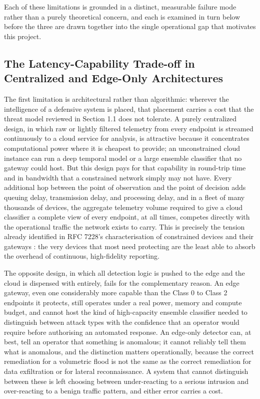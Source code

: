 Each of these limitations is grounded in a distinct, measurable failure mode rather than a purely theoretical concern, and each is examined in turn below before the three are drawn together into the single operational gap that motivates this project.

\subsection{The Latency-Capability Trade-off in Centralized and Edge-Only Architectures}

The first limitation is architectural rather than algorithmic: wherever the intelligence of a defensive system is placed, that placement carries a cost that the threat model reviewed in Section 1.1 does not tolerate. A purely centralized design, in which raw or lightly filtered telemetry from every endpoint is streamed continuously to a cloud service for analysis, is attractive because it concentrates computational power where it is cheapest to provide; an unconstrained cloud instance can run a deep temporal model or a large ensemble classifier that no gateway could host. But this design pays for that capability in round-trip time and in bandwidth that a constrained network simply may not have. Every additional hop between the point of observation and the point of decision adds queuing delay, transmission delay, and processing delay, and in a fleet of many thousands of devices, the aggregate telemetry volume required to give a cloud classifier a complete view of every endpoint, at all times, competes directly with the operational traffic the network exists to carry. This is precisely the tension already identified in RFC 7228's characterisation of constrained devices and their gateways \cite{Bormann2014}: the very devices that most need protecting are the least able to absorb the overhead of continuous, high-fidelity reporting.

The opposite design, in which all detection logic is pushed to the edge and the cloud is dispensed with entirely, fails for the complementary reason. An edge gateway, even one considerably more capable than the Class 0 to Class 2 endpoints it protects, still operates under a real power, memory and compute budget, and cannot host the kind of high-capacity ensemble classifier needed to distinguish between attack types with the confidence that an operator would require before authorising an automated response. An edge-only detector can, at best, tell an operator that something is anomalous; it cannot reliably tell them what is anomalous, and the distinction matters operationally, because the correct remediation for a volumetric flood is not the same as the correct remediation for data exfiltration or for lateral reconnaissance. A system that cannot distinguish between these is left choosing between under-reacting to a serious intrusion and over-reacting to a benign traffic pattern, and either error carries a cost.

